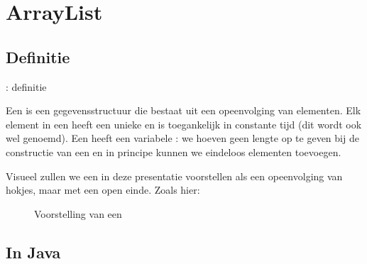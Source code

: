 \section{ArrayList}
\subsection{Definitie}
\begin{frame}{\dsarraylist{}: definitie}
\begin{definition}[\dsarraylist{}]
Een \term{\dsarraylist{}} is een gegevensstructuur die bestaat uit een opeenvolging van elementen. Elk element in een \dsarraylist{} heeft een unieke  en is toegankelijk in constante tijd (dit wordt ook wel  genoemd). Een \dsarraylist{} heeft een variabele : we hoeven geen lengte op te geven bij de constructie van een \dsarraylist{} en in principe kunnen we eindeloos elementen toevoegen.
\end{definition}
Visueel zullen we een \dsarraylist{} in deze presentatie voorstellen als een opeenvolging van hokjes, maar met een open einde. Zoals hier:
\begin{figure}
\caption{Voorstelling van een \dsarraylist{}}
\end{figure}
\end{frame}
\subsection{In Java}
